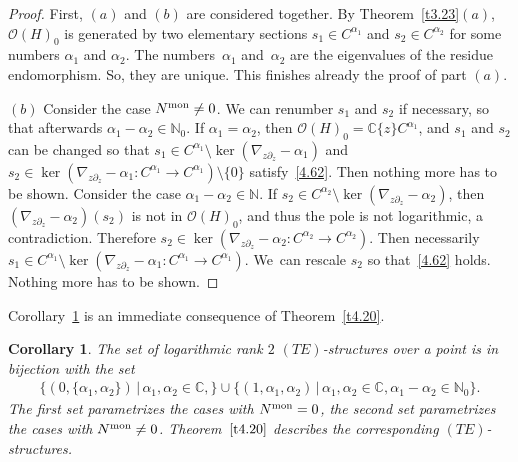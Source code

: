 \documentclass[pdftex]{sigma}%
\numberwithin{equation}{section}
\numberwithin{figure}{section}
\newcommand{\N}{{\mathbb N}}
\newcommand{\C}{{\mathbb C}}
\newcommand{\OO}{{\mathcal O}}
\newcommand{\paa}{\partial}
\newcommand{\nnn}{\nabla}
\newtheorem{Corollary}[Theorem]{Corollary}
\begin{document}
\begin{proof}
First, $(a)$ and $(b)$ are considered together.
By Theorem~\ref{t3.23}$(a)$, $\OO(H)_0$ is
generated by two elementary sections
$s_1\in C^{\alpha_1}$ and $s_2\in C^{\alpha_2}$
for some numbers $\alpha_1$ and $\alpha_2$.
The numbers~$\alpha_1$ and~$\alpha_2$ are the
eigenvalues of the residue endomorphism.
So, they are unique.
This finishes already the proof of part $(a)$.

$(b)$ Consider the case $N^{\rm mon}\neq 0$.
We can renumber $s_1$ and $s_2$ if necessary, so that
afterwards $\alpha_1-\alpha_2\in\N_0$.
If $\alpha_1=\alpha_2$, then $\OO(H)_0=\C\{z\}C^{\alpha_1}$,
and $s_1$ and $s_2$ can be changed so that
$s_1\in C^{\alpha_1}\setminus \ker(\nnn_{z\paa_z}-\alpha_1)$
and $s_2\in \ker(\nnn_{z\paa_z}-\alpha_1\colon
C^{\alpha_1}\to C^{\alpha_1})\setminus\{0\}$ satisfy~\eqref{4.62}.
Then nothing more has to be shown.
Consider the case $\alpha_1-\alpha_2\in\N$.
If $s_2\in C^{\alpha_2}\setminus \ker(\nnn_{z\paa_z}-\alpha_2)$,
then $(\nnn_{z\paa_z}-\alpha_2)(s_2)$ is not in
$\OO(H)_0$, and thus the pole is not logarithmic,
a contradiction. Therefore
$s_2\in \ker(\nnn_{z\paa_z}-\alpha_2\colon
C^{\alpha_2}\to C^{\alpha_2})$. Then necessarily
$s_1\in C^{\alpha_1}\setminus \ker(\nnn_{z\paa_z}-\alpha_1\colon
C^{\alpha_1} \to C^{\alpha_1})$.
We~can rescale $s_2$ so that~\eqref{4.62} holds.
Nothing more has to be shown.
\end{proof}

Corollary~\ref{t4.21} is an immediate consequence of
Theorem~\ref{t4.20}.

\begin{Corollary}\label{t4.21}
The set of logarithmic rank $2$ $(TE)$-structures over a point
is in bijection with the set
\begin{gather*}
\{(0,\{\alpha_1,\alpha_2\})\,|\, \alpha_1,\alpha_2\in\C,\}
\cup\{(1,\alpha_1,\alpha_2)\,|\, \alpha_1,\alpha_2\in\C,\alpha_1-\alpha_2\in \N_0\}.
\end{gather*}
The first set parametrizes the cases with $N^{\rm mon}=0$,
the second set parametrizes the cases with $N^{\rm mon}\neq 0$.
Theorem~$\ref{t4.20}$ describes the corresponding
$(TE)$-structures.
\end{Corollary}
\end{document}
